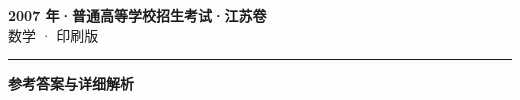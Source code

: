\documentclass[zihao=5, a4paper]{ctexart}
\begin{document}
\begin{center}
  {\Large\bfseries 2007 年·普通高等学校招生考试·江苏卷}\\[4pt]
  {\large 数学 · 印刷版}
\end{center}
\medskip
{}

\par\bigskip\hrule\bigskip
{}
\begin{center}{\large\bfseries 参考答案与详细解析}\end{center}
\smallskip

\end{document}
